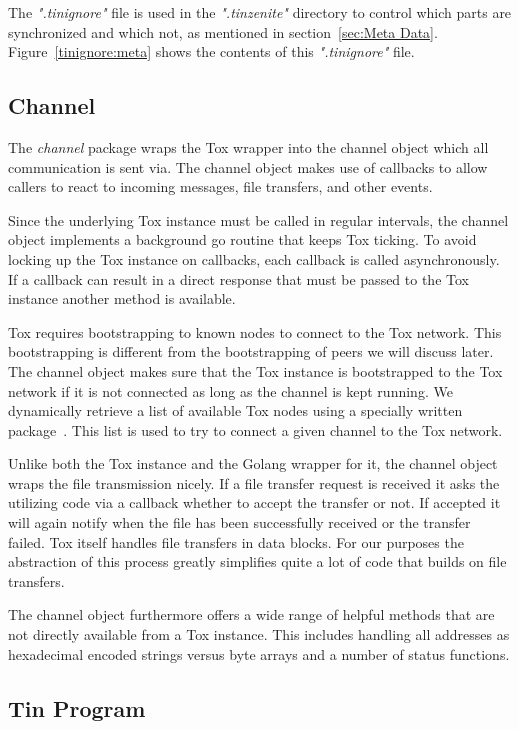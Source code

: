 The \textit{".tinignore"} file is used in the \textit{".tinzenite"} directory to control which parts are synchronized and which not, as mentioned in section~\ref{sec:Meta Data}.
Figure~\ref{tinignore:meta} shows the contents of this \textit{".tinignore"} file.

\subsection{Channel}
\label{sub:Channel}

The \emph{channel} package wraps the Tox wrapper into the channel object which all communication is sent via.
The channel object makes use of callbacks to allow callers to react to incoming messages, file transfers, and other events.

Since the underlying Tox instance must be called in regular intervals, the channel object implements a background go routine that keeps Tox ticking.
To avoid locking up the Tox instance on callbacks, each callback is called asynchronously.
If a callback can result in a direct response that must be passed to the Tox instance another method is available.

Tox requires bootstrapping to known nodes to connect to the Tox network.
This bootstrapping is different from the bootstrapping of peers we will discuss later.
The channel object makes sure that the Tox instance is bootstrapped to the Tox network if it is not connected as long as the channel is kept running.
We dynamically retrieve a list of available Tox nodes using a specially written package~\cite{web:site:github:tox-dynboot}.
This list is used to try to connect a given channel to the Tox network.

Unlike both the Tox instance and the Golang wrapper for it, the channel object wraps the file transmission nicely.
If a file transfer request is received it asks the utilizing code via a callback whether to accept the transfer or not.
If accepted it will again notify when the file has been successfully received or the transfer failed.
Tox itself handles file transfers in data blocks.
For our purposes the abstraction of this process greatly simplifies quite a lot of code that builds on file transfers.

The channel object furthermore offers a wide range of helpful methods that are not directly available from a Tox instance.
This includes handling all addresses as hexadecimal encoded strings versus byte arrays and a number of status functions.

\subsection{Tin Program}
\label{sub:Tin Program}

